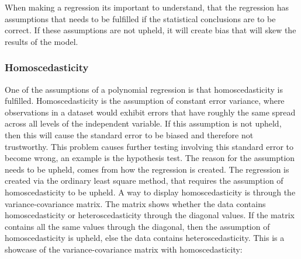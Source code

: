 When making a regression its important to understand, that the regression has assumptions that needs to be fulfilled if the statistical conclusions are to be correct. If these assumptions are not upheld, it will create bias that will skew the results of the model.
\subsubsection{Homoscedasticity}
One of the assumptions of a polynomial regression is that homoscedasticity is fulfilled. Homoscedasticity is the assumption of constant error variance, where observations in a dataset would exhibit errors that have roughly the same spread across all levels of the independent variable.
\newline
If this assumption is not upheld, then this will cause the standard error to be biased and therefore not trustworthy. This problem causes further testing involving this standard error to become wrong, an example is the hypothesis test.
\newline
The reason for the assumption needs to be upheld, comes from how the regression is created. The regression is created via the ordinary least square method, that requires the assumption of homoscedasticity to be upheld.
\newline
A way to display homoscedasticity is through the variance-covariance matrix. The matrix shows whether the data contains homoscedasticity or heteroscedasticity through the diagonal values. If the matrix contains all the same values through the diagonal, then the assumption of homoscedasticity is upheld, else the data contains heteroscedasticity. This is a showcase of the variance-covariance matrix with homoscedasticity:



